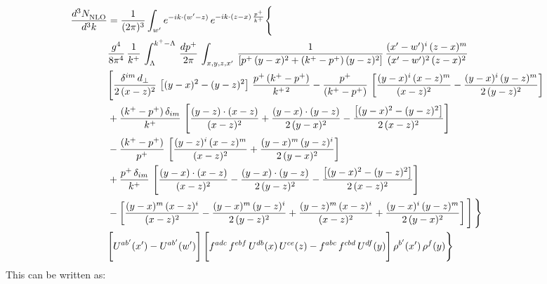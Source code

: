 \documentclass[9pt]{article}
\numberwithin{equation}{section}
\begin{document}
\begin{align}
    \frac{d^{3}N_{\rm NLO}^{\rm}}{d^{3}k}  & =  \frac{1}{(2\pi)^{3}}  \int_{ w^\prime} e^{-ik\cdot(w'-z)}\,e^{-ik\cdot (z-x)\,\frac{p^{+}}{k^{+}}} \Bigg\{\notag \\ & \frac{g^{4}}{8\pi^{4}}\,\frac{1}{k^{+}}\,\int_{\Lambda}^{k^{+}-\Lambda}\, \frac{dp^{+}}{2\pi} \, \int_{x,y,z,x'}\,\frac{1}{\left[p^{+}\,(y-x)^{2}+(k^{+}-p^{+})\,(y-z)^{2}\right]}\, \frac{(x'-w')^{i}\,(z-x)^{m}}{(x'-w')^{2}\,(z-x)^{2}} \notag \\ & \Bigg[\frac{\delta^{im}\,d_{\perp}}{2\,(x-z)^{2}}\,\left[(y-x)^{2}-(y-z)^{2}\right]\,\frac{p^{+}\,(k^{+}-p^{+})}{k^{+\,2}}-\frac{p^{+}}{(k^{+}-p^{+})}\,\left[\frac{(y-x)^{i}\,(x-z)^{m}}{(x-z)^{2}}-\frac{(y-x)^{i}\,(y-z)^{m}}{2\,(y-z)^{2}}\right]\notag \\ & +\frac{(k^{+}-p^{+})\,\delta_{im}}{k^{+}}\,\left[\frac{(y-z)\cdot (x-z)}{(x-z)^{2}}+\frac{(y-x)\cdot (y-z)}{2\,(y-x)^{2}}-\frac{\left[(y-x)^{2}-(y-z)^{2}\right]}{2\,(x-z)^{2}}\right]\notag \\ & -\frac{(k^{+}-p^{+})}{p^{+}}\,\left[\frac{(y-z)^{i}\,(x-z)^{m}}{(x-z)^{2}}+\frac{(y-x)^{m}\,(y-z)^{i}}{2\,(y-x)^{2}}\right]\notag \\ & +\frac{p^{+}\,\delta_{im}}{k^{+}}\,\left[\frac{(y-x)\cdot (x-z)}{(x-z)^{2}}-\frac{(y-x)\cdot (y-z)}{2\,(y-z)^{2}}-\frac{\left[(y-x)^{2}-(y-z)^{2}\right]}{2\,(x-z)^{2}}\right]\notag \\ &-\left[\frac{(y-x)^{m}\,(x-z)^{i}}{(x-z)^{2}}-\frac{(y-x)^{m}\,(y-z)^{i}}{2\,(y-z)^{2}}+\frac{(y-z)^{m}\,(x-z)^{i}}{(x-z)^{2}}+\frac{(y-x)^{i}\,(y-z)^{m}}{2\,(y-x)^{2}}\right]\Bigg]\,\Bigg\} \notag \\ & \Bigg[U^{ab'}(x')-U^{ab'}(w')\Bigg]\,\Bigg[f^{adc}\,f^{ebf}\,U^{db}(x)\,U^{ce}(z)-f^{abc}\,f^{cbd}\,U^{df}(y)\Bigg]\,\rho^{b'}(x')\,\rho^{f}(y)\Bigg\}
\end{align}
This can be written as: 
\end{document}
